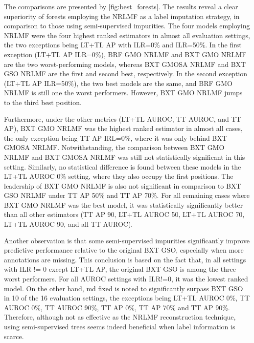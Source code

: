 The comparisons are presented by \autoref{fig:best_forests}. The results reveal a clear superiority of forests employing the NRLMF as a label imputation strategy, in comparison to those using semi-supervised impurities. The four models employing NRLMF were the four highest ranked estimators in almost all evaluation settings, the two exceptions being LT+TL AP with ILR=0\% and ILR=50\%. In the first exception (LT+TL AP ILR=0\%), BRF GMO NRLMF and BXT GMO NRLMF are the two worst-performing models, whereas BXT GMOSA NRLMF and BXT GSO NRLMF are the first and second best, respectively. In the second exception (LT+TL AP ILR=50\%), the two best models are the same, and BRF GMO NRLMF is still one the worst performers. However, BXT GMO NRLMF jumps to the third best position. 


Furthermore, under the other metrics (LT+TL AUROC, TT AUROC, and TT AP), BXT GMO NRLMF was the highest ranked estimator in almost all cases, the only exception being TT AP IRL=0\%, where it was only behind BXT GMOSA NRLMF. Notwithstanding, the comparison between BXT GMO NRLMF and BXT GMOSA NRLMF was still not statistically significant in this setting. Similarly, no statistical difference is found between these models in the LT+TL AUROC 0\% setting, where they also occupy the first positions. The leadership of BXT GMO NRLMF is also not significant in comparison to BXT GSO NRLMF under TT AP 50\% and TT AP 70\%. For all remaining cases where BXT GMO NRLMF was the best model, it was statistically significantly better than all other estimators (TT AP 90, LT+TL AUROC 50, LT+TL AUROC 70, LT+TL AUROC 90, and all TT AUROC).


Another observation is that some semi-supervised impurities significantly improve predictive performance relative to the original BXT GSO, especially when more annotations are missing. This conclusion is based on the fact that, in all settings with ILR != 0 except LT+TL AP, the original BXT GSO is among the three worst performers. For all AUROC settings with ILR!=0, it was the lowest ranked model. On the other hand, md fixed is noted to significantly surpass BXT GSO in 10 of the 16 evaluation settings, the exceptions being LT+TL AUROC 0\%, TT AUROC 0\%, TT AUROC 90\%, TT AP 0\%, TT AP 70\% and TT AP 90\%. Therefore, although not as effective as the NRLMF reconstruction technique, using semi-supervised trees seems indeed beneficial when label information is scarce.


